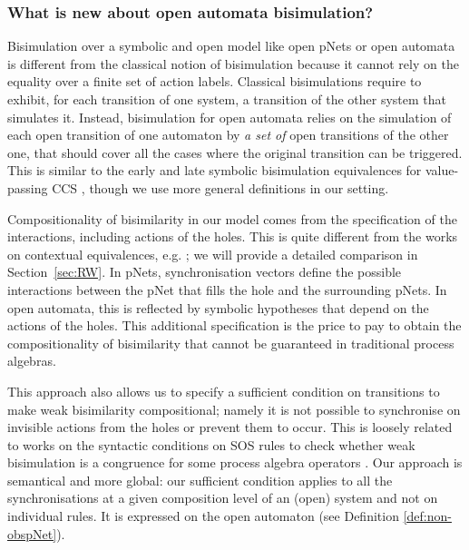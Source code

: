 \documentclass{elsarticle}
\newcommand{\TODO}[1]{\textcolor{red}{\textbf{[TODO:#1]}}}
\begin{document}
\subsubsection*{What is new about open automata bisimulation?}

Bisimulation over a symbolic and open model like open pNets or open automata is  different from the classical notion of bisimulation because it cannot rely on the equality over a finite set of action labels. Classical bisimulations require to exhibit, for each transition of one system, a transition of the other system that simulates it. Instead, bisimulation for open automata  relies on the simulation of each open transition of one automaton by \emph{a set of} open transitions of the other one, that should cover all the 
cases where the original transition can be triggered. %
This is similar to the early and late symbolic bisimulation equivalences for value-passing CCS \cite{HennessyLin:TCS95}, though we use more general definitions in our setting.

Compositionality of bisimilarity in our model comes from the specification of the interactions, including actions of the holes. 
This is quite different from the works on contextual equivalences, e.g. \cite{Larsen87, Larsen:91}; we will provide a detailed comparison in Section~\ref{sec:RW}.
In pNets, synchronisation vectors define the possible interactions between the pNet that fills the hole and the surrounding pNets. In open automata, this is reflected by symbolic hypotheses that depend on the actions of the holes. This additional specification is the price to pay to obtain the compositionality of bisimilarity that cannot be guaranteed in traditional process algebras. 

This approach also allows us to specify a sufficient condition on  transitions to make weak bisimilarity compositional; namely it is not possible to synchronise on invisible actions from the holes or prevent them to occur.
This is loosely related to works on the syntactic conditions on SOS rules to check whether weak bisimulation is a congruence for some process algebra operators \cite{GROOTE1992202}. Our approach is semantical and more global: our sufficient condition applies to all the synchronisations at a given composition level of an (open) system and not on individual rules. It is expressed on the open automaton (see Definition \ref{def:non-obspNet}).
\end{document}
